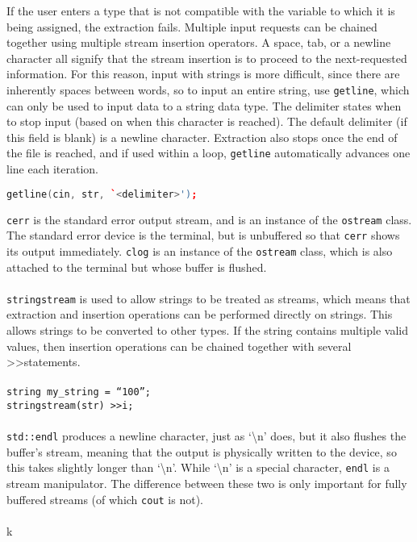 \documentclass[10pt]{article}
\begin{document}
If the user enters a type that is not compatible with the variable to which it is being assigned, the extraction fails. Multiple input requests can be chained together using multiple stream insertion operators. A space, tab, or a newline character all signify that the stream insertion is to proceed to the next-requested information. For this reason, input with strings is more difficult, since there are inherently spaces between words, so to input an entire string, use \texttt{getline}, which can only be used to input data to a string data type. The delimiter states when to stop input (based on when this character is reached). The default delimiter (if this field is blank) is a newline character. Extraction also stops once the end of the file is reached, and if used within a loop, \texttt{getline} automatically advances one line each iteration.

\begin{lstlisting}[language=C++]
getline(cin, str, `<delimiter>');
\end{lstlisting}

\texttt{cerr} is the standard error output stream, and is an instance of the \texttt{ostream} class. The standard error device is the terminal, but is unbuffered so that \texttt{cerr} shows its output immediately. \texttt{clog} is an instance of the \texttt{ostream} class, which is also attached to the terminal but whose buffer is flushed.\\
\\
\texttt{stringstream} is used to allow strings to be treated as streams, which means that extraction and insertion operations can be performed directly on strings. This allows strings to be converted to other types. If the string contains multiple valid values, then insertion operations can be chained together with several \textgreater\textgreater statements.\\
\\
\color{red}\texttt{string my\_string = ``100'';}\color{black}\\
\color{red}\texttt{stringstream(str) \textgreater\textgreater i;}\color{black}\\
\\
\texttt{std::endl} produces a newline character, just as `\textbackslash n' does, but it also flushes the buffer's stream, meaning that the output is physically written to the device, so this takes slightly longer than `\textbackslash n'. While `\textbackslash n' is a special character, \texttt{endl} is a stream manipulator. The difference between these two is only important for fully buffered streams (of which \texttt{cout} is not).\\
\\
k
\end{document}
